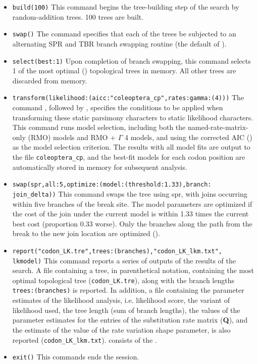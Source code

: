 \begin{itemize}
\item \texttt{build(100)} This command begins the tree-building step of the search by random-addition trees. 100 trees 
are built.
\item \texttt{swap()} The  command specifies that each of the trees be subjected to an 
alternating SPR and TBR branch swapping routine (the default of \poy).
\item \texttt{select(best:1)} Upon completion of branch swapping, this command selects 1 of 
the most optimal () topological trees in memory. All other trees are discarded 
from memory.
\item \texttt{transform(likelihood:(aicc:"coleoptera\_cp",rates:gamma:(4)))} The command 
, followed by , specifies the conditions to be applied 
when transforming these static parsimony characters to static likelihood characters. This command runs model 
selection, including both the named-rate-matrix-only (RMO) models and RMO + $\Gamma$ 4 models, 
and using the corrected AIC () as the model selection criterion. The results with all model fits are 
output to the file \texttt{coleoptera\_cp}, and the best-fit models for each codon position are automatically 
stored in memory for subsequent analysis.
\item \texttt{swap(spr,all:5,optimize:(model:(threshold:1.33),branch: \\ join\_delta))} This command swaps the tree using 
spr, with joins occurring within five branches of the break site. The model parameters are
optimized if the cost of the join under the current model is within 1.33 times the current best cost (proportion 0.33 worse). 
Only the branches along the path from the break to the new join location are optimized (). 
\item \texttt{report("codon\_LK.tre",trees:(branches),"codon\_LK\_lkm.txt",\\ lkmodel)} This command reports a 
series of outputs of the results of the search.  A file containing a tree, in parenthetical notation, containing the most 
optimal topological tree (\texttt{codon\_LK.tre}), along with the branch lengths \texttt{trees:(branches)} is reported.
In addition, a file containing the parameter estimates of the likelihood analysis, i.e. likelihood score, the variant of 
likelihood used, the tree length (sum of branch lengths), the values 
of the parameter estimates for the entries of the substitution rate matrix (\textbf{Q}), and the estimate of the value of 
the rate variation shape parameter, is also reported (\texttt{codon\_LK\_lkm.txt}). 
consists of the .
\item \texttt{exit()} This commands ends the \poy session.
\end{itemize}

